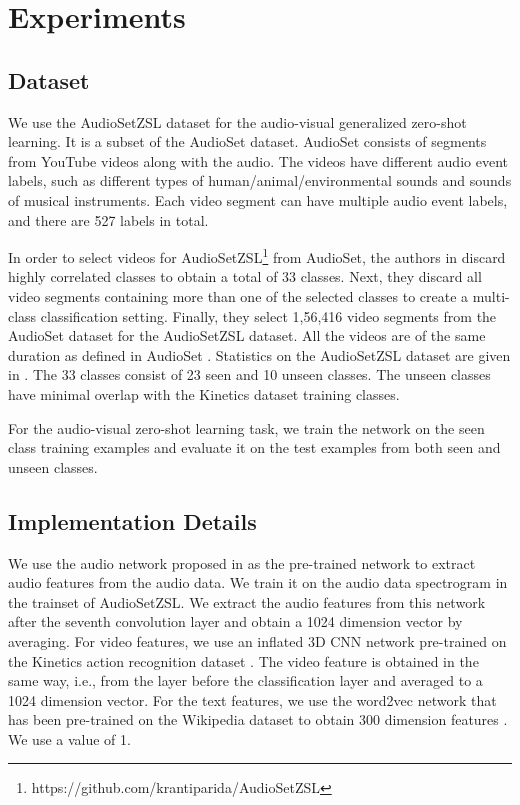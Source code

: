 \documentclass[10pt,twocolumn,letterpaper]{article}
\begin{document}
\section{Experiments}
\subsection{Dataset}
We use the AudioSetZSL dataset \cite{parida2020coordinated} for the audio-visual generalized zero-shot learning. It is a subset of the AudioSet \cite{gemmeke2017audio} dataset. AudioSet consists of segments from YouTube videos along with the audio. The videos have different audio event labels, such as different types of human/animal/environmental sounds and sounds of musical instruments. Each video segment can have multiple audio event labels, and there are 527 labels in total.


In order to select videos for AudioSetZSL\footnote{https://github.com/krantiparida/AudioSetZSL} from AudioSet, the authors in \cite{parida2020coordinated} discard highly correlated classes to obtain a total of 33 classes.  Next, they discard all video segments containing more than one of the selected classes to create a multi-class classification setting. Finally, they select 1,56,416 video segments from the AudioSet dataset for the AudioSetZSL dataset. All the videos are of the same duration as defined in AudioSet \cite{gemmeke2017audio}. Statistics on the AudioSetZSL dataset are given in \cite{parida2020coordinated}. The 33 classes consist of 23 seen and 10 unseen classes. The unseen classes have minimal overlap with the Kinetics dataset \cite{carreira2017quo} training classes. 

For the audio-visual zero-shot learning task, we train the network on the seen class training examples and evaluate it on the test examples from both seen and unseen classes.


\subsection{Implementation Details}
We use the audio network proposed in \cite{kumar2018knowledge} as the pre-trained network to extract audio features from the audio data. We train it on the audio data spectrogram in the trainset of AudioSetZSL. We extract the audio features from this network after the seventh convolution layer and obtain a 1024 dimension vector by averaging. For video features, we use an inflated 3D CNN network pre-trained on the Kinetics action recognition dataset \cite{carreira2017quo}. The video feature is obtained in the same way, i.e., from the layer before the classification layer and averaged to a 1024 dimension vector. For the text features, we use the word2vec network that has been pre-trained on the Wikipedia dataset to obtain 300 dimension features \cite{mikolov2017advances}. We use a  value of 1.
\end{document}
